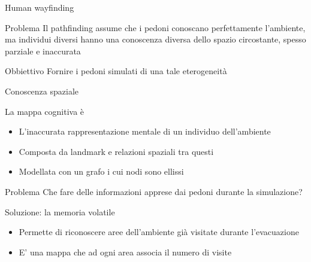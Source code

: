 \documentclass{beamer}
\begin{document}
\begin{frame}{Human wayfinding}
\begin{alertblock}{Problema}
Il pathfinding assume che i pedoni conoscano perfettamente l'ambiente, ma individui diversi hanno una \textcolor{bostonuniversityred}{conoscenza diversa} dello spazio circostante, spesso \textcolor{bostonuniversityred}{parziale} e \textcolor{bostonuniversityred}{inaccurata}
\end{alertblock}
\begin{block}{Obbiettivo}
Fornire i pedoni simulati di una tale eterogeneità
\end{block}
\end{frame}

\begin{frame}{Conoscenza spaziale}
\begin{block}{La mappa cognitiva è}
\begin{itemize}
    \item L'inaccurata rappresentazione mentale di un individuo dell’ambiente
    \item Composta da \textcolor{bostonuniversityred}{landmark} e relazioni spaziali tra questi
    \item Modellata con un grafo i cui nodi sono \textcolor{bostonuniversityred}{ellissi}
\end{itemize}
\end{block}
\begin{alertblock}{Problema}
Che fare delle informazioni apprese dai pedoni durante la simulazione?
\end{alertblock}
\begin{block}{Soluzione: la memoria volatile}
\begin{itemize}
    \item Permette di riconoscere aree dell'ambiente già visitate durante l'evacuazione
    \item E' una mappa che ad ogni area associa il numero di visite
\end{itemize}{}
\end{block}{}
\end{frame}{}
\end{document}
